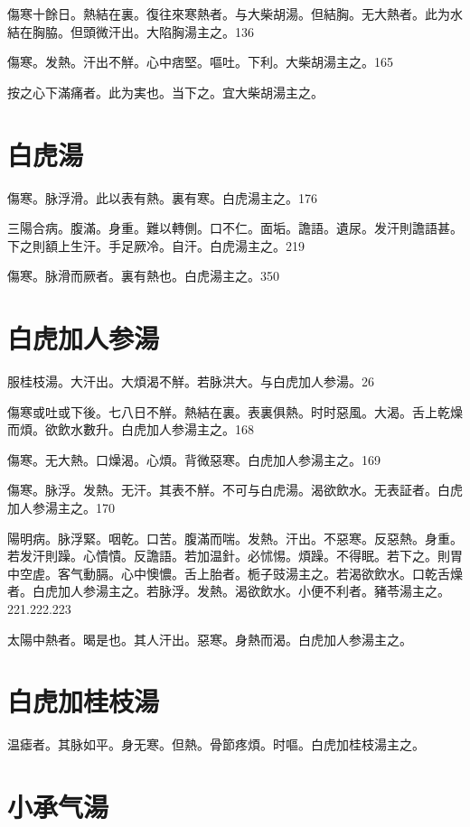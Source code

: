 \documentclass[12pt,twoside,UTF8,b5paper]{ctexbook}
\begin{document}
傷寒十餘日。熱結在裏。復往來寒熱者。与大柴胡湯。但結胸。无大熱者。此为水結在胸脇。{但}頭微汗出。大陷胸湯主之。136

傷寒。发熱。汗出不觧。心中痞堅。嘔吐。下利。大柴胡湯主之。165

按之心下滿痛者。此为実也。当下之。宜大柴胡湯主之。

\section{白虎湯}

傷寒。脉浮滑。此以表有熱。裏有寒。白虎湯主之。176

三陽合病。腹滿。身重。難以轉側。口不仁。面垢。譫語。遺尿。发汗則譫語{甚}。下之則額上生汗。手足厥冷。自汗。白虎湯主之。219

傷寒。脉滑而厥者。裏有熱也。白虎湯主之。350

\section{白虎加人参湯}

服桂枝湯。大汗出。大煩渴不觧。若脉洪大。与白虎{加人参}湯。26

傷寒或吐或下後。七八日不觧。熱結在裏。表裏俱熱。时时惡風。大渴。舌上乾燥而煩。欲飲水數升。白虎{加人参}湯主之。168

傷寒。无大熱。口燥渴。心煩。背微惡寒。白虎{加人参}湯主之。169

傷寒。脉浮。发熱。无汗。其表不觧。不可与白虎湯。渴欲飲水。无表証者。白虎{加人参}湯主之。170

陽明病。脉浮緊。咽乾。口苦。腹滿而喘。发熱。汗出。不惡寒。反惡熱。身重。若发汗則躁。心憒憒。反譫語。若加温針。必怵惕。煩躁。不得眠。若下之。則胃中空虗。客气動膈。心中懊憹。舌上胎者。栀子{豉}湯主之。若渴欲飲水。口乾舌燥者。白虎{加人参}湯主之。若脉浮。发熱。渴欲飲水。小便不利者。豬苓湯主之。221.222.223

太陽中熱者。暍是也。其人汗出。惡寒。身熱而渴。白虎{加人参}湯主之。

\section{白虎加桂枝湯}

温瘧者。其脉如平。身无寒。但熱。骨節疼煩。时嘔。白虎加桂枝湯主之。

\section{小承气湯}
\end{document}
